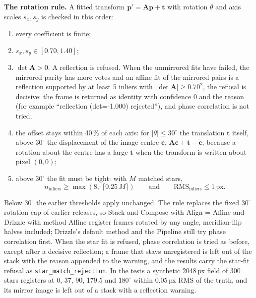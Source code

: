 \documentclass[11pt,a4paper]{article}
\newcommand{\code}[1]{\texttt{\small #1}}
\newcommand{\mat}[1]{\mathbf{#1}}
\begin{document}
    \textbf{The rotation rule.} A fitted transform $\mathbf{p}' = \mat{A}\mathbf{p} + \mathbf{t}$ with rotation $\theta$ and axis scales $s_x, s_y$ is checked in this order:
    \begin{enumerate}[nosep]
    \item every coefficient is finite;
    \item $s_x, s_y \in [0.70, 1.40]$;
    \item $\det \mat{A} > 0$. A reflection is refused. When the unmirrored fits have failed, the mirrored parity has more votes and an affine fit of the mirrored pairs is a reflection supported by at least 5 inliers with $|\det \mat{A}| \ge 0.70^2$, the refusal is decisive: the frame is returned as identity with confidence 0 and the reason (for example ``reflection (det=-1.000) rejected''), and phase correlation is not tried;
    \item the offset stays within 40\,\% of each axis: for $|\theta| \le 30^{\circ}$ the translation $\mathbf{t}$ itself, above $30^{\circ}$ the displacement of the image centre $\mathbf{c}$, $\mat{A}\mathbf{c} + \mathbf{t} - \mathbf{c}$, because a rotation about the centre has a large $\mathbf{t}$ when the transform is written about pixel $(0, 0)$;
    \item above $30^{\circ}$ the fit must be tight: with $M$ matched stars,
        \begin{equation}
            n_{\text{inliers}} \ge \max\!\left(8,\; \lceil 0.25\,M \rceil\right) \qquad\text{and}\qquad \text{RMS}_{\text{inliers}} \le 1\,\text{px}.
        \end{equation}
    \end{enumerate}
    Below $30^{\circ}$ the earlier thresholds apply unchanged. The rule replaces the fixed $30^{\circ}$ rotation cap of earlier releases, so Stack and Compose with Align = Affine and Drizzle with method Affine register frames rotated by any angle, meridian-flip halves included; Drizzle's default method and the Pipeline still try phase correlation first. When the star fit is refused, phase correlation is tried as before, except after a decisive reflection; a frame that stays unregistered is left out of the stack with the reason appended to the warning, and the results carry the star-fit refusal as \code{star\_match\_rejection}. In the tests a synthetic 2048\,px field of 300 stars registers at 0, 37, 90, 179.5 and $180^{\circ}$ within 0.05\,px RMS of the truth, and its mirror image is left out of a stack with a reflection warning.
\end{document}

